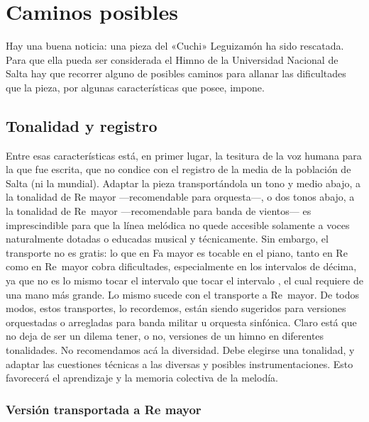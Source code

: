 \chapter{Caminos posibles}
\label{cap:caminos}

Hay una buena noticia: una pieza del «Cuchi» Leguizamón ha sido rescatada. Para que ella pueda ser considerada el Himno de la Universidad Nacional de Salta hay que recorrer alguno de posibles caminos para allanar las dificultades que la pieza, por algunas características que posee, impone.

\section{Tonalidad y registro}
\label{sec:tonalidad-registro}

Entre esas características está, en primer lugar, la tesitura de la voz humana para la que fue escrita, que no condice con el registro de la media de la población de Salta (ni la mundial). Adaptar la pieza transportándola un tono y medio abajo, a la tonalidad de Re mayor ---recomendable para orquesta---, o dos tonos abajo, a la tonalidad de Re\bemoltxt\ mayor ---recomendable para banda de vientos--- es imprescindible para que la línea melódica no quede accesible solamente a voces naturalmente dotadas o educadas musical y técnicamente. Sin embargo, el transporte no es gratis: lo que en Fa mayor es tocable en el piano, tanto en Re como en Re\bemoltxt\ mayor cobra dificultades, especialmente en los intervalos de décima, ya que no es lo mismo tocar el intervalo  que tocar el intervalo \hbox{,} el cual requiere de una mano más grande. Lo mismo sucede con el transporte a Re\bemoltxt\ mayor. De todos modos, estos transportes, lo recordemos, están siendo sugeridos para versiones orquestadas o arregladas para banda militar u orquesta sinfónica. Claro está que no deja de ser un dilema tener, o no, versiones de un himno en diferentes tonalidades. No recomendamos acá la diversidad. Debe elegirse una tonalidad, y adaptar las cuestiones técnicas a las diversas y posibles instrumentaciones. Esto favorecerá el aprendizaje y la memoria colectiva de la melodía.

\subsection{Versión transportada a Re mayor}
\label{subsec:transporte-re}


